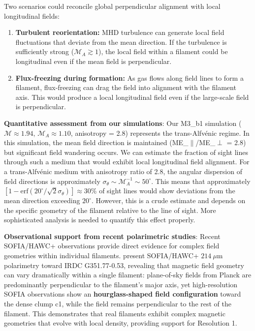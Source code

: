 \documentclass[11pt,a4paper]{article}
\begin{document}
Two scenarios could reconcile global perpendicular alignment with local longitudinal fields:
\begin{enumerate}
    \item \textbf{Turbulent reorientation:} MHD turbulence can generate local field fluctuations that deviate from the mean direction. If the turbulence is sufficiently strong ($\mathcal{M}_A \gtrsim 1$), the local field within a filament could be longitudinal even if the mean field is perpendicular.
    \item \textbf{Flux-freezing during formation:} As gas flows along field lines to form a filament, flux-freezing can drag the field into alignment with the filament axis. This would produce a local longitudinal field even if the large-scale field is perpendicular.
\end{enumerate}

\textbf{Quantitative assessment from our simulations}: Our M3\_b1 simulation ($\mathcal{M} \approx 1.94$, $\mathcal{M}_A \approx 1.10$, anisotropy = 2.8) represents the trans-Alfv\'enic regime. In this simulation, the mean field direction is maintained (ME\_$\parallel$/ME\_$\perp$ = 2.8) but significant field wandering occurs. We can estimate the fraction of sight lines through such a medium that would exhibit local longitudinal field alignment. For a trans-Alfv\'enic medium with anisotropy ratio of 2.8, the angular dispersion of field directions is approximately $\sigma_\theta \sim \mathcal{M}_A^{-1} \sim 50^\circ$. This means that approximately $[1 - \text{erf}(20^\circ/\sqrt{2}\sigma_\theta)] \approx 30$\% of sight lines would show deviations from the mean direction exceeding $20^\circ$. However, this is a crude estimate and depends on the specific geometry of the filament relative to the line of sight. More sophisticated analysis is needed to quantify this effect properly.

\textbf{Observational support from recent polarimetric studies}: Recent SOFIA/HAWC+ observations provide direct evidence for complex field geometries within individual filaments. \citet{Jadhav2026} present SOFIA/HAWC+ $214~\mu$m polarimetry toward IRDC G351.77-0.53, revealing that magnetic field geometry can vary dramatically within a single filament: plane-of-sky fields from Planck are predominantly perpendicular to the filament's major axis, yet high-resolution SOFIA observations show an \textbf{hourglass-shaped field configuration} toward the dense clump c1, while the field remains perpendicular to the rest of the filament. This demonstrates that real filaments exhibit complex magnetic geometries that evolve with local density, providing support for Resolution 1.
\end{document}
